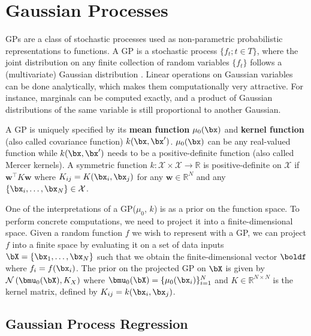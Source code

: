 \section{Gaussian Processes}
\label{sec:gps}

\acf{GPs} are a class of stochastic processes used as non-parametric probabilistic representations to functions.
A \ac{GP} is a stochastic process $\{f_t;t\in T\}$, where the joint distribution on any finite collection of random variables $\{f_t\}$ follows a (multivariate) Gaussian distribution \cite{rasmussen2006gaussian}.
Linear operations on Gaussian variables can be done analytically, which makes them computationally very attractive.
For instance, marginals can be computed exactly, and a product of Gaussian distributions of the same variable is still proportional to another Gaussian.

A \ac{GP} is uniquely specified by its \textbf{mean function} $\mu_0(\bx)$ and \textbf{kernel function} (also called covariance function) $k(\bx, \bx')$.
$\mu_0(\bx)$ can be any real-valued function while $k(\bx, \bx')$ needs to be a positive-definite function (also called Mercer kernels).
A symmetric function $k:\mathcal{X}\times\mathcal{X}\rightarrow \mathbb{R} $ is positive-definite on $\mathcal{X}$ if $\boldsymbol{w}^\top K \boldsymbol{w}$ where $K_{ij} = K(\bx_i,\bx_j)$ for any $\boldsymbol{w}\in\mathbb{R}^N$ and any $\{\bx_i,\ldots,\bx_N\} \in \mathcal{X}$.

One of the interpretations of a \ac{GP}($\mu_0$, $k$) is as a prior on the function space.
To perform concrete computations, we need to project it into a finite-dimensional space.
Given a random function $f$ we wish to represent with a \ac{GP}, we can project $f$ into a finite space by evaluating it on a set of data inputs $\bX = \{\bx_1, \ldots, \bx_N\}$ such that we obtain the finite-dimensional vector $\boldf$ where $f_i = f(\bx_i)$.
The prior on the projected \ac{GP} on $\bX$ is given by $\mathcal{N}\left(\bmu_0(\bX), K_{X}\right)$ where $\bmu_0(\bX) = \{\mu_0(\bx_i)\}_{i=1}^N$ and $K \in \mathbb{R}^{N\times N}$ is the kernel matrix, defined by $K_{ij} = k(\bx_i, \bx_j)$.

\subsection{Gaussian Process Regression}

